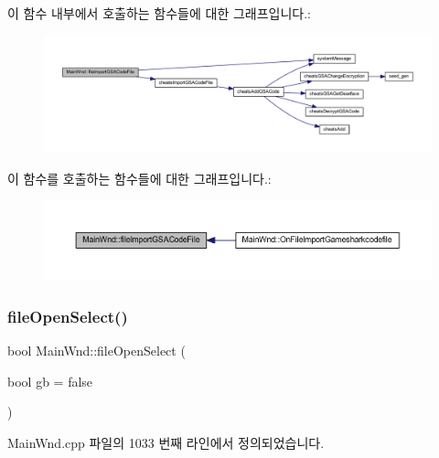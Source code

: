 이 함수 내부에서 호출하는 함수들에 대한 그래프입니다.\+:
\nopagebreak
\begin{figure}[H]
\begin{center}
\leavevmode
\includegraphics[width=350pt]{class_main_wnd_af376f9dd20c49c2b0543102e321ea79c_cgraph}
\end{center}
\end{figure}
이 함수를 호출하는 함수들에 대한 그래프입니다.\+:
\nopagebreak
\begin{figure}[H]
\begin{center}
\leavevmode
\includegraphics[width=350pt]{class_main_wnd_af376f9dd20c49c2b0543102e321ea79c_icgraph}
\end{center}
\end{figure}
\mbox{\label{class_main_wnd_a872b497a88ca77012694cc909c62e6e4}} 
\subsubsection{\texorpdfstring{file\+Open\+Select()}{fileOpenSelect()}}
{\footnotesize\ttfamily bool Main\+Wnd\+::file\+Open\+Select (\begin{DoxyParamCaption}\item[{bool}]{gb = {\ttfamily false} }\end{DoxyParamCaption})}



Main\+Wnd.\+cpp 파일의 1033 번째 라인에서 정의되었습니다.


